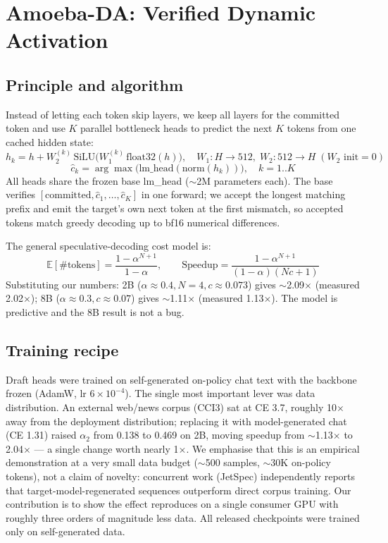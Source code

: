 \documentclass[11pt,a4paper]{article}
\begin{document}
\section{Amoeba-DA: Verified Dynamic Activation}
\subsection{Principle and algorithm}
Instead of letting each token skip layers, we keep all layers for the committed token and use
$K$ parallel bottleneck heads to predict the next $K$ tokens from one cached hidden state:
\begin{equation}
h_k = h + W_2^{(k)}\,\mathrm{SiLU}\big(W_1^{(k)}\,\mathrm{float32}(h)\big),
\quad W_1\!:\!H\!\to\!512,\; W_2\!:\!512\!\to\!H\; (W_2 \text{ init}=0)
\end{equation}
\begin{equation}
\hat{c}_k = \arg\max\big(\mathrm{lm\_head}(\mathrm{norm}(h_k))\big),\quad k=1..K
\end{equation}
All heads share the frozen base lm\_head ($\sim$2M parameters each). The base verifies
$[\text{committed},\hat{c}_1,\dots,\hat{c}_K]$ in one forward; we accept the longest matching
prefix and emit the target's own next token at the first mismatch, so accepted tokens match
greedy decoding up to bf16 numerical differences.

The general speculative-decoding cost model is:
\begin{equation}
\mathbb{E}[\#\text{tokens}] = \frac{1-\alpha^{N+1}}{1-\alpha},\qquad
\text{Speedup} = \frac{1-\alpha^{N+1}}{(1-\alpha)(Nc+1)}
\end{equation}
Substituting our numbers: 2B ($\alpha\!\approx\!0.4,N\!=\!4,c\!\approx\!0.073$) gives
$\sim$2.09$\times$ (measured 2.02$\times$); 8B ($\alpha\!\approx\!0.3,c\!\approx\!0.07$) gives
$\sim$1.11$\times$ (measured 1.13$\times$). The model is predictive and the 8B result is not a bug.

\subsection{Training recipe}
Draft heads were trained on self-generated on-policy chat text with the backbone frozen
(AdamW, lr $6\times10^{-4}$). The single most important lever was data distribution. An external
web/news corpus (CCI3) sat at CE 3.7, roughly 10$\times$ away from the deployment distribution;
replacing it with model-generated chat (CE 1.31) raised $\alpha_2$ from 0.138 to 0.469 on 2B,
moving speedup from $\sim$1.13$\times$ to 2.04$\times$ --- a single change worth nearly
1$\times$. We emphasise that this is an empirical demonstration at a very small data budget
($\sim$500 samples, $\sim$30K on-policy tokens), not a claim of novelty: concurrent work
(JetSpec) independently reports that target-model-regenerated sequences outperform direct
corpus training. Our contribution is to show the effect reproduces on a single consumer GPU
with roughly three orders of magnitude less data. All released checkpoints were trained only
on self-generated data.
\end{document}
